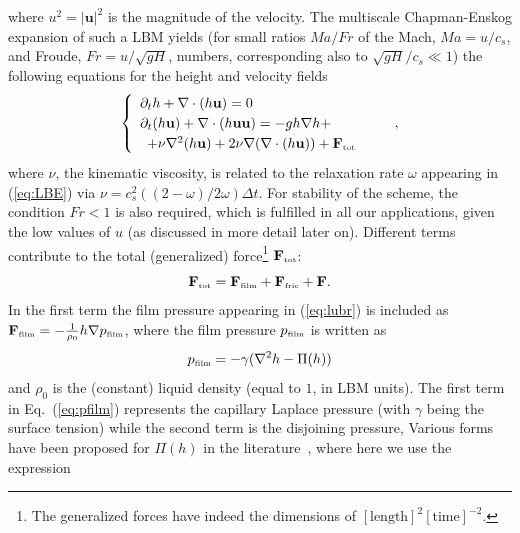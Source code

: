 where $u^2 = |\mathbf{u}|^2$ is the magnitude of the velocity.
The multiscale Chapman-Enskog expansion \cite{Chapman,Enskog} of such a
LBM yields (for small ratios $Ma/Fr$
of the Mach, $Ma=u/c_s$, and Froude, $Fr = u/\sqrt{gH}$, numbers,
corresponding also to $\sqrt{g H}/c_s \ll 1$) the following equations
for the height and velocity fields~\cite{PhysRevE.65.036309,van2010study,Salmon:1999:0022-2402:503}
\begin{equation}\label{eq:hydro}
\begin{cases}
\begin{array}{ll}
\partial_t h + \nabla \cdot (h \mathbf{u})  = 0 & \\ 
\partial_t (h \mathbf{u}) + \nabla \cdot (h \mathbf{u}\mathbf{u}) = -gh \nabla h +\\ 
\,\,\, +  \nu \nabla^2 (h\mathbf{u}) + 2\nu \nabla (\nabla \cdot (h\mathbf{u})) +
\mathbf{F}_{\mbox{\tiny{tot}}} 
\end{array}
\end{cases},
\end{equation}
where $\nu$, the kinematic viscosity, is related to the relaxation rate $\omega$ appearing
in (\ref{eq:LBE}) via $\nu = c_s^2((2-\omega)/2\omega)\Delta t$. 
For stability of the scheme, the condition $Fr < 1$
is also required, which is fulfilled in all our applications,
given the low values of $u$ (as discussed in more detail later on).
Different terms contribute to the total (generalized) force\footnote{The generalized forces have
indeed the dimensions of $[\mbox{length}]^2[\mbox{time}]^{-2}$.}
$\mathbf{F}_{\mbox{\tiny{tot}}}$:
\begin{equation}\label{eq:force}
\mathbf{F}_{\mbox{\tiny{tot}}} = \mathbf{F}_{\mbox{\tiny{film}}} + \mathbf{F}_{\mbox{\tiny{fric}}} + \mathbf{F}. 
\end{equation}
In the first term the film pressure appearing in (\ref{eq:lubr}) is included as
$\mathbf{F}_{\mbox{\tiny{film}}} = -\frac{1}{\rho_0}h\nabla p_{\mbox{\tiny{film}}}$, where the film pressure $p_{\mbox{\tiny{film}}}$ 
is written as
\begin{equation}\label{eq:pfilm}
p_{\mbox{\tiny{film}}} = - \gamma (\nabla^2 h -\Pi(h))
\end{equation}
and $\rho_0$ is the (constant) liquid density 
(equal to $1$, in LBM units). 
The first term in Eq.~(\ref{eq:pfilm}) represents the capillary Laplace pressure (with $\gamma$
being the surface tension) while the second term is the disjoining pressure,
Various forms have been proposed for $\Pi(h)$ in the
literature~\cite{RevModPhys.69.931,THIELE2014399}, where here we use the expression
